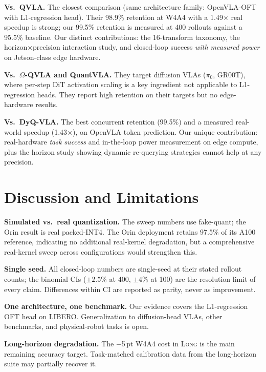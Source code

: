 \documentclass[conference]{IEEEtran}
\begin{document}
\textbf{Vs.\ QVLA.} The closest comparison (same architecture family: OpenVLA-OFT with
L1-regression head). Their 98.9\% retention at W4A4 with a 1.49$\times$ real speedup is
strong; our 99.5\% retention is measured at 400 rollouts against a 95.5\% baseline. Our
distinct contributions: the 16-transform taxonomy, the horizon$\times$precision
interaction study, and closed-loop success \emph{with measured power} on Jetson-class
edge hardware.

\textbf{Vs.\ $\Omega$-QVLA and QuantVLA.} They target diffusion VLAs ($\pi_0$, GR00T),
where per-step DiT activation scaling is a key ingredient not applicable to L1-regression
heads. They report high retention on their targets but no edge-hardware results.

\textbf{Vs.\ DyQ-VLA.} The best concurrent retention (99.5\%) and a measured real-world
speedup (1.43$\times$), on OpenVLA token prediction. Our unique contribution: real-hardware
\emph{task success} and in-the-loop power measurement on edge compute, plus the horizon
study showing dynamic re-querying strategies cannot help at any precision.

\section{Discussion and Limitations}
\label{sec:discussion}

\textbf{Simulated vs.\ real quantization.} The sweep numbers use fake-quant; the Orin
result is real packed-INT4. The Orin deployment retains 97.5\% of its A100 reference,
indicating no additional real-kernel degradation, but a comprehensive real-kernel sweep
across configurations would strengthen this.

\textbf{Single seed.} All closed-loop numbers are single-seed at their stated rollout
counts; the binomial CIs ($\pm2.5\%$ at 400, $\pm4\%$ at 100) are the resolution limit of
every claim. Differences within CI are reported as parity, never as improvement.

\textbf{One architecture, one benchmark.} Our evidence covers the L1-regression OFT head
on LIBERO. Generalization to diffusion-head VLAs, other benchmarks, and physical-robot
tasks is open.

\textbf{Long-horizon degradation.} The $-$5\,pt W4A4 cost in \textsc{Long} is the main
remaining accuracy target. Task-matched calibration data from the long-horizon suite may
partially recover it.
\end{document}
